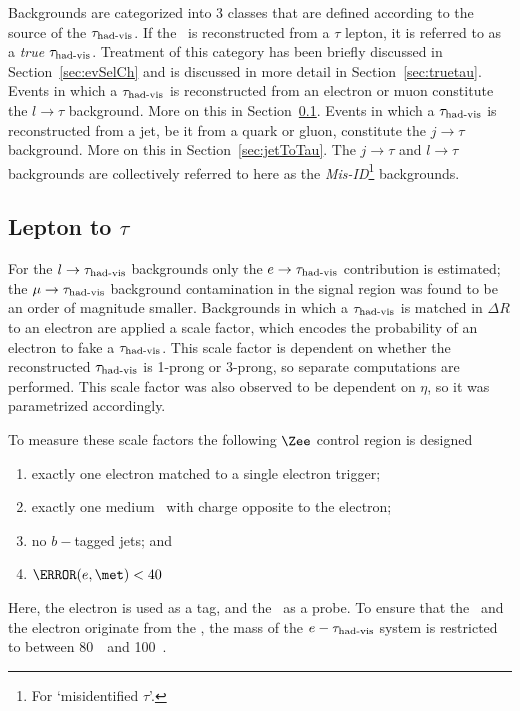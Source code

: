 \par Backgrounds are categorized into 3 classes that are defined according to the 
source of the $\tau_{\text{had-vis}}$.   
If the \tauvis\ is reconstructed from a $\tau$ lepton, it is referred to as a {\it true} 
$\tau_{\text{had-vis}}$. Treatment of this category has been briefly discussed in Section~\ref{sec:evSelCh} and 
is discussed in more detail in Section~\ref{sec:truetau}. Events in which a $\tau_{\text{had-vis}}$ is reconstructed from an electron or muon  
constitute the $l\to\tau$ background. More on this in Section~\ref{sec:lepToTau}.
Events in which a $\tau_{\text{had-vis}}$ is reconstructed from a jet, be it from a quark or gluon, 
constitute the $j\to\tau$ background. More on this in Section~\ref{sec:jetToTau}. 
The $j\to\tau$ and $l\to\tau$ backgrounds are collectively 
referred to here as the {\it Mis-ID}\footnote{For `misidentified $\tau$'.}  backgrounds. 

\subsection{Lepton to $\tau$}
\label{sec:lepToTau}
\par For the $l\to\tau_{\text{had-vis}}$ backgrounds only the $e\to\tau_{\text{had-vis}}$ contribution is estimated; 
the $\mu\to\tau_{\text{had-vis}}$ background contamination in the signal region was found to be an order of magnitude smaller. 
Backgrounds in which a $\tau_{\text{had-vis}}$ is matched in $\Delta R$ to an electron are 
applied a scale factor, which encodes the probability of an electron to fake a $\tau_{\text{had-vis}}$. This 
scale factor is dependent on whether the reconstructed $\tau_{\text{had-vis}}$ is 1-prong or 3-prong, so separate 
computations are performed. This scale factor was also observed to be dependent on $\eta$, so it was 
parametrized accordingly. 

\par To measure these scale factors the following $\Zee$ control region is designed 

\begin{enumerate}
\item exactly one electron matched to a single electron trigger;
\item exactly one medium \tauvis\ with charge opposite to the electron;
\item no $b-$tagged jets; and 
\item $\mT(e,\met)<40$~\GeV
\end{enumerate}  

Here, the electron is used as a tag, and the \tauvis\ as a probe. 
To ensure that the \tauvis\ and the electron originate from the \Zboson, the mass of the 
$e-\tau_{\text{had-vis}}$ system is restricted to between 80~\GeV\ and 100~\GeV.

